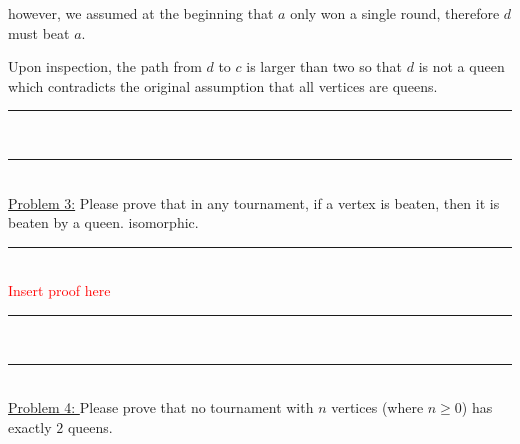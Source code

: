 \documentclass{article}
\newcommand{\problemsep}{\leavevmode\\[0.05in] \rule[\baselineskip/4]{\textwidth}{1pt} \\[0.005in] \rule[\baselineskip]{\textwidth}{1pt}\vspace{-\baselineskip}\leavevmode\\[0.05in]}
\newcommand{\statementsep}{\leavevmode\\[0.005in] \rule[\baselineskip/4]{\textwidth}{0.4pt}\leavevmode\\[0.005in]}
\begin{document}
\begin{center}
\end{center}
however, we assumed at the beginning that $a$ only won a single round, therefore $d$ must beat $a$.
\begin{center}
\end{center}
Upon inspection, the path from $d$ to $c$ is larger than two so that $d$ is not a queen which contradicts the original assumption that all vertices are queens.
\problemsep
\noindent\underline{Problem 3:} Please prove that in any tournament, if a vertex is beaten, then it is beaten
by a queen. 
isomorphic.
\statementsep
\textcolor{red}{Insert proof here}
\problemsep
\noindent\underline{Problem 4: } Please prove that no tournament with $n$ vertices  (where $n \geq 0$) has 
exactly $2$ queens.
\end{document}
